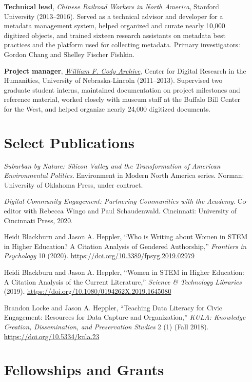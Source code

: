 \textbf{Technical lead}, \emph{Chinese Railroad Workers in North
America}, Stanford University (2013--2016). Served as a technical
advisor and developer for a metadata management system, helped organized
and curate nearly 10,000 digitized objects, and trained sixteen research
assistants on metadata best practices and the platform used for
collecting metadata. Primary investigators: Gordon Chang and Shelley
Fischer Fishkin.

\textbf{Project manager}, \emph{\href{http://codyarchive.org}{William F.
Cody Archive}}, Center for Digital Research in the Humanities,
University of Nebraska-Lincoln (2011--2013). Supervised two graduate
student interns, maintained documentation on project milestones and
reference material, worked closely with museum staff at the Buffalo Bill
Center for the West, and helped organize nearly 24,000 digitized
documents.

\section{Select Publications}\label{select-publications}

\emph{Suburban by Nature: Silicon Valley and the Transformation of
American Environmental Politics}. Environment in Modern North America
series. Norman: University of Oklahoma Press, under contract.

\emph{Digital Community Engagement: Partnering Communities with the
Academy}. Co-editor with Rebecca Wingo and Paul Schaudenwald.
Cincinnati: University of Cincinnati Press, 2020.

Heidi Blackburn and Jason A. Heppler, ``Who is Writing about Women in
STEM in Higher Education? A Citation Analysis of Gendered Authorship,''
\emph{Frontiers in Psychology} 10 (2020).
\url{https://doi.org/10.3389/fpsyg.2019.02979}

Heidi Blackburn and Jason A. Heppler, ``Women in STEM in Higher
Education: A Citation Analysis of the Current Literature,''
\emph{Science \& Technology Libraries} (2019).
\url{https://doi.org/10.1080/0194262X.2019.1645080}

Brandon Locke and Jason A. Heppler, ``Teaching Data Literacy for Civic
Engagement: Resources for Data Capture and Organization,'' \emph{KULA:
Knowledge Creation, Dissemination, and Preservation Studies} 2 (1) (Fall
2018). \url{https://doi.org/10.5334/kula.23}

\section{Fellowships and Grants}\label{fellowships-and-grants}

